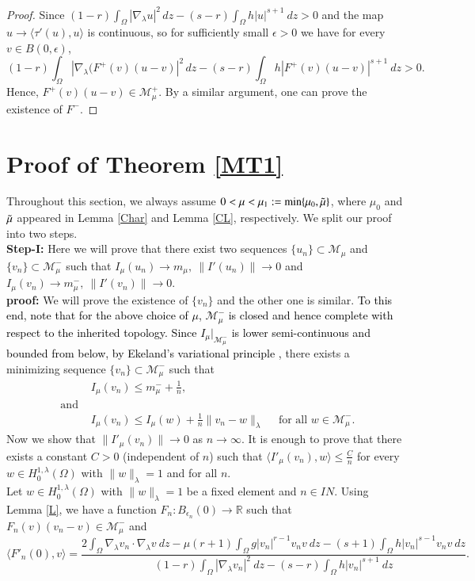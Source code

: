 \documentclass[12pt, notitlepage]{article}
\def\R{\mathbb{R}}
\def\N{{I\!\!N}}
\begin{document}
{\begin{proof}
Since $(1-r)\int_\Omega |\nabla_\lambda u|^2\, dz-(s-r)\int_\Omega h|u|^{s+1}\ dz>0$ and the map $u\to \langle\tau'(u),u\rangle$ is continuous, so for sufficiently small $\epsilon>0$ we have for every $v\in B(0,\epsilon)$,
$$(1-r)\int_\Omega |\nabla_\lambda(F^+(v) (u-v)|^2\, dz-(s-r)\int_\Omega h|F^+(v)(u-v)|^{s+1}\ dz>0.$$ Hence, 
$F^+(v)(u-v)\in\mathscr{M}_\mu^+.$ By a similar argument, one can prove the existence of $F^-$.
\end{proof}

\section{ Proof of Theorem \ref{MT1}}\label{PMT1}
 Throughout this section, we always assume $0<\mu<\mu_1:=\min\{ \mu_0,\Tilde{\mu}\}$, where $\mu_0$ and $\Tilde{\mu}$ appeared in Lemma \ref{Char} and Lemma \ref{CL}, respectively. We split our proof into two steps. \\
\textbf{Step-I:} Here we will prove that there exist two sequences $\{u_n\}\subset \mathscr{M}_\mu$ and $\{v_n\}\subset \mathscr{M}^-_\mu$ such that 
$I_\mu(u_n)\to m_\mu,\ \|I'(u_n)\|\to 0$ and $I_\mu(v_n)\to m^-_\mu,\ \|I'(v_n)\|\to 0.$\\
\textbf{proof:} We will prove the existence of $\{v_n\}$ and the other one is similar. \textcolor{black}{To this end, note that for the above choice of $\mu$, $\mathcal{M}_\mu^-$ is closed and hence complete with respect to the inherited topology. Since $I_\mu\big|_{\mathcal{M}_\mu^-}$ is lower semi-continuous and bounded from below, by Ekeland's variational principle \cite[Theorem 1.1]{IE},} there exists a minimizing sequence $\{v_n\}\subset\mathscr{M}^-_\mu$ such that
\begin{align}
    &I_\mu(v_n)\leq m^-_\mu+\frac{1}{n},\\
    \text{ and }&\nonumber\\
    &I_\mu(v_n)\leq I_\mu(w)+\frac{1}{n}\|v_n-w\|_\lambda\quad\mbox{ for all } w\in \mathscr{M}^-_\mu\label{EK}.
\end{align}
Now we show that $\|I'_\mu(v_n)\|\to 0$ as $n\to\infty$. It is enough to prove that there exists a constant $C>0$ (independent of $n$) such that $\langle I'_\mu(v_n),w\rangle\leq\frac{C}{n}$ for every $w\in H^{1,\lambda}_0(\Omega)$ with $\|w\|_\lambda=1$ and for all $n$.\\
Let $w\in H^{1,\lambda}_0(\Omega)$ with $\|w\|_\lambda=1$ be a fixed element and $n\in \N$. Using Lemma \ref{L}, we have a function $F_n: B_{\epsilon_n}(0)\to \R$ such that $F_n(v)(v_n-v)\in \mathscr{M}^-_\mu$ and $$\langle F'_n(0),v\rangle=\frac{2\int_\Omega \nabla_\lambda v_n\cdot \nabla_\lambda v\ dz-\mu(r+1)\int_\Omega g |v_n|^{r-1}v_nv \ dz-(s+1)\int_\Omega h|v_n|^{s-1}v_nv \ dz }{(1-r)\int_\Omega |\nabla_\lambda v_n|^2\ dz-(s-r)\int_\Omega h|v_n|^{s+1}\ dz}.$$
}
\end{document}
